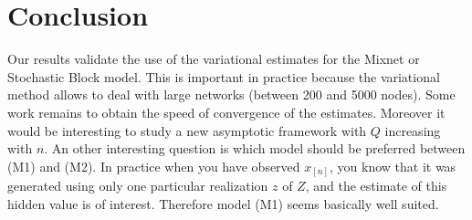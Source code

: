 \documentclass[11pt]{article}
\newcommand{\xn}{x_{[n]}}
\begin{document}
\section{Conclusion}
Our results validate the use of the variational estimates for the Mixnet or Stochastic Block model. This is important in practice because the variational method allows to deal with large networks (between 200 and 5000 nodes). Some work remains to obtain the speed of convergence of the estimates. Moreover it would be interesting to study a new asymptotic framework with $Q$ increasing with $n$. An other interesting question is which model should be preferred between (M1) and (M2). In practice when you have observed $\xn$, you know that it was generated using only one particular realization $z$ of $Z$, and the estimate of this hidden value is of interest. Therefore model (M1) seems basically  well suited.
















\newpage


\appendix
\end{document}
